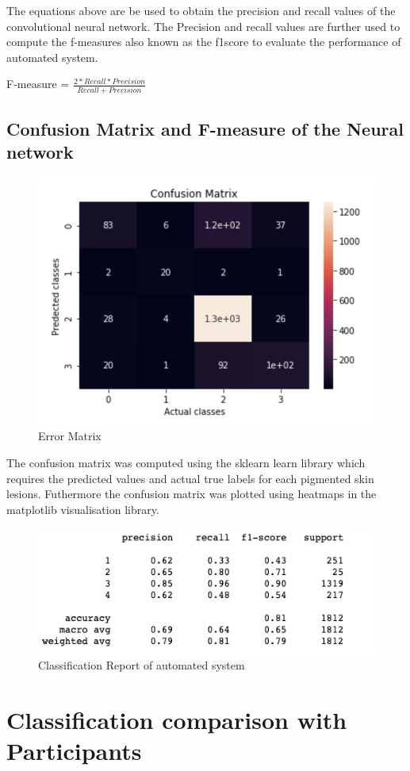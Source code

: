 The equations above are be used to obtain the precision and recall values of the 
convolutional neural network. The Precision and recall values are further used 
to compute the f-measures also known as the f1score to evaluate the performance of 
automated system. \\ 
\begin{center}
    F-measure = ${\frac{2 * Recall * Precision}{Recall + Precision}}$
\end{center}

\subsection*{Confusion Matrix and F-measure of the Neural network}
\begin{figure}[!htp]
    \includegraphics[width=\textwidth]{Images/cma.png}
    \caption{Error Matrix}
    \label{fig:ErrorMatrix}
\end{figure}

The confusion matrix was computed using the sklearn learn library which requires the predicted values and 
actual true labels for each pigmented skin lesions. Futhermore the confusion matrix  was plotted using heatmaps
in the matplotlib visualisation library.
\pagebreak

\begin{figure}[!htp]
    \includegraphics[width=\textwidth]{Images/f11.png}
    \caption{Classification Report of automated system}
    \label{fig:f11}
\end{figure}

\pagebreak

\section{Classification comparison with Participants}
